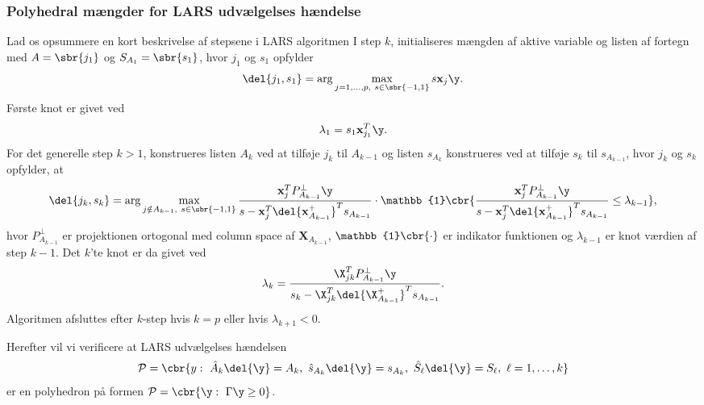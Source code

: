 \subsubsection{Polyhedral mængder for LARS udvælgelses hændelse}

Lad os opsummere en kort beskrivelse af stepsene i LARS algoritmen
I step \(k\), initialiseres mængden af aktive variable og listen af fortegn med \(A=\sbr{j_1}\) og \(S_{A_1} = \sbr{s_1}\), hvor \(j_1\) og \(s_1\) opfylder
\begin{align}
\del{j_1, s_1} = \arg \max_{j=1,\ldots, p, \ s \in \sbr{-1,1}} s \mathbf{x}_j \y. \label{eq:polyhedron_rep_LARS1}
\end{align}
Første knot er givet ved
\begin{align*}
\lambda_1 = s_1 \mathbf{x}_{j_1}^T \y.
\end{align*}
For det generelle step \(k > 1\), konstrueres listen \(A_k\) ved at tilføje \(j_k\) til \(A_{k-1}\) og listen \(s_{A_k}\) konstrueres ved at tilføje \(s_k\) til \(s_{A_{k-1}}\), hvor \(j_k\) og \(s_k\) opfylder, at
\begin{align}
\del{j_k, s_k} = \arg \max_{j \notin A_{k-1} , \ s \in \sbr{-1,1}} \frac{\mathbf{x}_j^T P_{A_{k-1}}^\perp \y}{s - \mathbf{x}_j^T \del{\mathbf{x}_{A_{k-1}}^+}^T s_{A_{k-1}}} \cdot \mathbb{1} \cbr{\frac{\mathbf{x}_j^T P_{A_{k-1}}^\perp \y}{s - \mathbf{x}_j^T \del{\mathbf{x}_{A_{k-1}}^+}^T s_{A_{k-1}}} \leq \lambda_{k-1}}, \label{eq:polyhedron_rep_LARS2}
\end{align}
hvor \(P_{A_{k-1}}^\perp \) er projektionen ortogonal med column space af \(\mathbf{X}_{A_{k-1}}\), \(\mathbb{1} \cbr{\cdot}\) er indikator funktionen og \(\lambda_{k-1}\) er knot værdien af step \(k-1\).
Det \(k\)'te knot er da givet ved
\begin{align}
\lambda_k = \frac{\X_{jk}^T P_{A_{k-1}}^\perp \y}{s_k - \X_{jk}^T \del{\X_{A_{k-1}}^+}^T s_{A_{k-1}}}. \label{eq:polyhedron_rap_LARS3}
\end{align}
Algoritmen afsluttes efter \(k\)-step hvis \(k=p\) eller hvis \(\lambda_{k+1} < 0\).

Herefter vil vi verificere at LARS udvælgelses hændelsen
\begin{align}
\mathcal{P} = \cbr{y: \ \hat{A}_k \del{\y} = A_k, \ \hat{s}_{A_k} \del{\y} = s_{A_k}, \ \hat{S}_\ell \del{\y} = S_\ell, \ \ell = 1, \ldots, k} \label{eq:post_28}
\end{align}
er en polyhedron på formen \(\mathcal{P} = \cbr{\y : \ \Gamma \y \geq 0}\).


